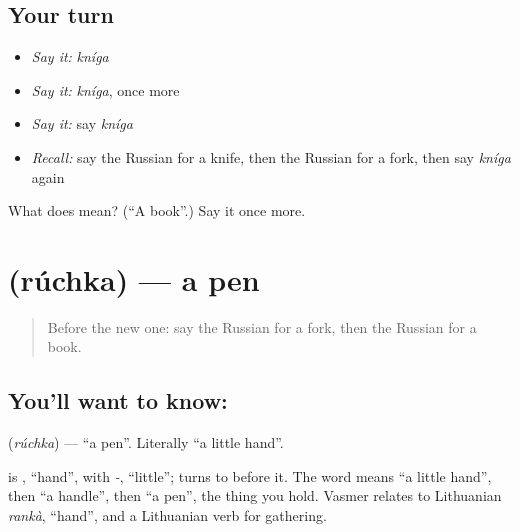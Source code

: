 \subsection*{Your turn}
\begin{itemize}
\raggedright
  \item \emph{Say it:} \emph{kníga}
  \item \emph{Say it:} \emph{kníga}, once more
  \item \emph{Say it:} say \emph{kníga}
  \item \emph{Recall:} say the Russian for a knife, then the Russian for a fork, then say \emph{kníga} again
\end{itemize}

\begin{tcolorbox}[breakable,colback=teal!4,colframe=teal!35!black,title={Before you move on}]
What does  mean? (\textquotedblleft{}A book\textquotedblright{}.) Say it once more.
\end{tcolorbox}
\section[\texorpdfstring{\ru{ручка} (rúchka)}{ручка (rúchka)}]{ (rúchka) — a pen}

\label{lesson:RU-C52-pen}



\begin{quote}
Before the new one: say the Russian for a fork, then the Russian for a book.
\end{quote}

\subsection*{You'll want to know: }
\textbf{} (\emph{rúchka}) — \textquotedblleft{}a pen\textquotedblright{}. Literally \textquotedblleft{}a little hand\textquotedblright{}.

\begin{cousinweb}
\textbf{} is \emph{}, \textquotedblleft{}hand\textquotedblright{}, with \emph{-}, \textquotedblleft{}little\textquotedblright{}; \emph{} turns to \emph{} before it. The word means \textquotedblleft{}a little hand\textquotedblright{}, then \textquotedblleft{}a handle\textquotedblright{}, then \textquotedblleft{}a pen\textquotedblright{}, the thing you hold. Vasmer relates \emph{} to Lithuanian \emph{rankà}, \textquotedblleft{}hand\textquotedblright{}, and a Lithuanian verb for gathering.
\end{cousinweb}

